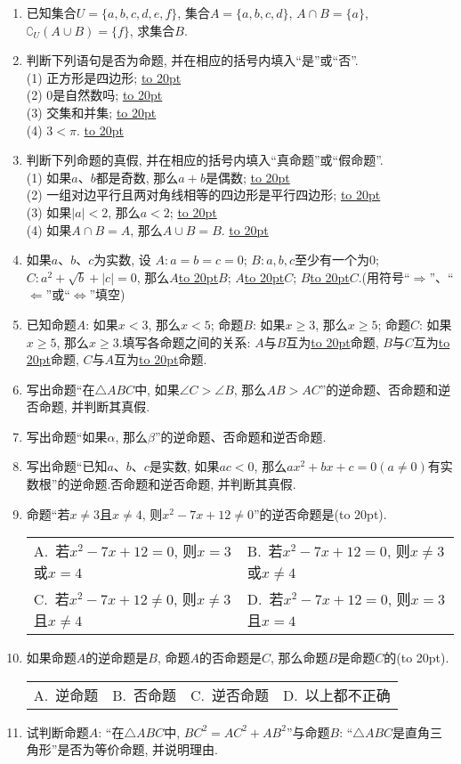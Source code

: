 \documentclass[10pt,a4paper]{article}
\newcommand{\blank}[1]{\underline{\hbox to #1pt{}}}
\newcommand{\bracket}[1]{(\hbox to #1pt{})}
\newcommand{\twoch}[4]{\par\begin{tabular}{p{.46\textwidth}p{.46\textwidth}}
A.~#1& B.~#2\\
C.~#3& D.~#4
\end{tabular}}
\newcommand{\fourch}[4]{\par\begin{tabular}{p{.23\textwidth}p{.23\textwidth}p{.23\textwidth}p{.23\textwidth}}
A.~#1 &B.~#2& C.~#3& D.~#4
\end{tabular}}
\begin{document}
\begin{enumerate}[1.]
\item 已知集合$U=\{a,b,c,d,e,f\}$, 集合$A=\{a,b,c,d\}$, $A\cap B=\{a\}$, $\complement _U(A\cup B)=\{f\}$, 求集合$B$.
\item 判断下列语句是否为命题, 并在相应的括号内填入``是''或``否''.\\
(1) 正方形是四边形; \blank{20}\\
(2) $0$是自然数吗; \blank{20}\\
(3) 交集和并集; \blank{20}\\
(4) $3<\pi$. \blank{20}
\item 判断下列命题的真假, 并在相应的括号内填入``真命题''或``假命题''.\\
(1) 如果$a$、$b$都是奇数, 那么$a+b$是偶数; \blank{20}\\
(2) 一组对边平行且两对角线相等的四边形是平行四边形; \blank{20}\\
(3) 如果$|a|<2$, 那么$a<2$; \blank{20}\\
(4) 如果$A\cap B=A$, 那么$A\cup B=B$. \blank{20}
\item 如果$a$、$b$、$c$为实数, 设
$A:a=b=c=0$; $B:a,b,c$至少有一个为$0$; $C:a^2+\sqrt b+|c|=0$, 那么$A$\blank{20}$B$; $A$\blank{20}$C$; $B$\blank{20}$C$.(用符号``$\Rightarrow$''、``$\Leftarrow$''或``$\Leftrightarrow$''填空)
\item 已知命题$A$: 如果$x<3$, 那么$x<5$; 命题$B$: 如果$x\ge 3$, 那么$x\ge 5$; 命题$C$: 如果$x\ge 5$, 那么$x\ge 3$.填写各命题之间的关系:
$A$与$B$互为\blank{20}命题, $B$与$C$互为\blank{20}命题, $C$与$A$互为\blank{20}命题.
\item 写出命题``在$\triangle ABC$中, 如果$\angle C>\angle B$, 那么$AB>AC$''的逆命题、否命题和逆否命题, 并判断其真假.
\item 写出命题``如果$\alpha$, 那么$\beta$''的逆命题、否命题和逆否命题.
\item 写出命题``已知$a$、$b$、$c$是实数, 如果$ac<0$, 那么$ax^2+bx+c=0(a\ne 0)$有实数根''的逆命题.否命题和逆否命题, 并判断其真假.
\item 命题``若$x\ne 3$且$x\ne 4$, 则$x^2-7x+12\ne 0$''的逆否命题是\bracket{20}.
\twoch{若$x^2-7x+12=0$, 则$x=3$或$x=4$}{若$x^2-7x+12=0$, 则$x\ne 3$或$x\ne 4$}{若$x^2-7x+12\ne 0$, 则$x\ne 3$且$x\ne 4$}{若$x^2-7x+12=0$, 则$x=3$且$x=4$}
\item 如果命题$A$的逆命题是$B$, 命题$A$的否命题是$C$, 那么命题$B$是命题$C$的\bracket{20}.
\fourch{逆命题}{否命题}{逆否命题}{以上都不正确}
\item 试判断命题$A$: ``在$\triangle ABC$中, $BC^2=AC^2+AB^2$''与命题$B$: ``$\triangle ABC$是直角三角形''是否为等价命题, 并说明理由.

\end{enumerate}
\end{document}
